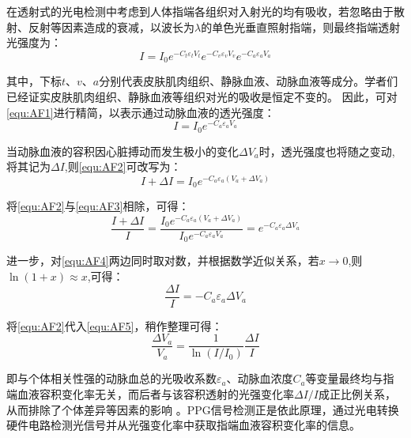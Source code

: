 在透射式的光电检测中考虑到人体指端各组织对入射光的均有吸收，若忽略由于散射、反射等因素造成的衰减，以波长为$\lambda$的单色光垂直照射指端，则最终指端透射光强度为\cite{4122392}：
\begin{equation}
    \label{equ:AF1}
    I=I_{0}e^{-C_{t}\varepsilon _{t}V_{t}}e^{-C_{v}\varepsilon _{v}V_{v}} e^{-C_{a}\varepsilon _{a}V_{a}} 
\end{equation}

其中，下标$t$、$v$、$a$分别代表皮肤肌肉组织、静脉血液、动脉血液等成分。学者们已经证实皮肤肌肉组织、静脉血液等组织对光的吸收是恒定不变的\cite{1980Spectrophotometric,4122392}。
因此，可对\autoref{equ:AF1}进行精简，以表示通过动脉血液的透光强度\cite{PPGYY}：
\begin{equation}
    \label{equ:AF2}
    I=I_{0}e^{-C_{a}\varepsilon _{a}V_{a}} 
\end{equation}

当动脉血液的容积因心脏搏动而发生极小的变化$\Delta V_{a}$时，透光强度也将随之变动,将其记为$\Delta I$,则\autoref{equ:AF2}可改写为：
\begin{equation}
    \label{equ:AF3}
    I+\Delta I=I_{0}e^{-C_{a}\varepsilon _{a}(V_{a}+\Delta V_{a})} 
\end{equation}

将\autoref{equ:AF2}与\autoref{equ:AF3}相除，可得：
\begin{equation}
    \label{equ:AF4}
    \frac{I+\Delta I}{I}=\frac{I_{0}e^{-C_{a}\varepsilon _{a}(V_{a}+\Delta V_{a})}}{I_{0}e^{-C_{a}\varepsilon _{a}V_{a}}}=e^{-C_{a}\varepsilon _{a}\Delta V_{a}} 
\end{equation}

进一步，对\autoref{equ:AF4}两边同时取对数，并根据数学近似关系，若$x\rightarrow 0$,则$\ln(1+x)\approx x$,可得：
\begin{equation}
    \label{equ:AF5}
    \frac{\Delta I}{I}=-C_{a}\varepsilon _{a}\Delta V_{a}
\end{equation}

将\autoref{equ:AF2}代入\autoref{equ:AF5}，稍作整理可得：
\begin{equation}
    \label{equ:AF6}
    \frac{\Delta V_{a}}{V_{a}}=\frac{1}{\ln(I/I_{0})}\frac{\Delta I}{I}
\end{equation}

即与个体相关性强的动脉血总的光吸收系数$\varepsilon _{a}$、动脉血浓度$C_{a}$等变量最终均与指端血液容积变化率无关，而后者与该容积透射的光强变化率$\Delta I/I$成正比例关系，从而排除了个体差异等因素的影响
\cite{1980Spectrophotometric,4122392,PPGYY}。PPG信号检测正是依此原理，通过光电转换硬件电路检测光信号并从光强变化率中获取指端血液容积变化率的信息。
